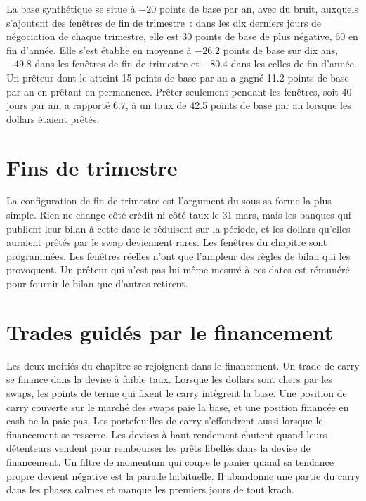 La base synthétique se situe à $-20$ points de base par an, avec du bruit, auxquels s'ajoutent des fenêtres de fin de trimestre~: dans les dix derniers jours de négociation de chaque trimestre, elle est
30 points de base de plus négative, 60 en fin d'année. Elle s'est établie en moyenne à $-26.2$ points de base sur dix ans, $-49.8$ dans les fenêtres de fin de trimestre et $-80.4$ dans les
celles de fin d'année. Un prêteur dont le  atteint 15 points de base par an a gagné 11.2
points de base par an en prêtant en permanence. Prêter seulement pendant les fenêtres, soit 40 jours par an, a rapporté 6.7, à un taux de 42.5 points de base par an lorsque les dollars étaient prêtés.

\section{Fins de trimestre}

La configuration de fin de trimestre est l'argument du  sous sa forme la plus simple. Rien ne change côté crédit ni côté taux le 31 mars, mais les banques qui publient
leur bilan à cette date le réduisent sur la période, et les dollars qu'elles auraient prêtés par le swap deviennent rares. Les fenêtres du chapitre sont
programmées. Les fenêtres réelles n'ont que l'ampleur des règles de bilan qui les provoquent. Un prêteur qui n'est pas lui-même mesuré à ces dates est rémunéré pour
fournir le bilan que d'autres retirent.

\section{Trades guidés par le financement}

Les deux moitiés du chapitre se rejoignent dans le financement. Un trade de carry se finance dans la devise à faible taux. Lorsque les dollars sont chers par les swaps, les points
de terme qui fixent le carry intègrent la base. Une position de carry couverte sur le marché des swaps paie la base, et une position financée en cash ne la paie pas. Les portefeuilles de carry
s'effondrent aussi lorsque le financement se resserre. Les devises à haut rendement chutent quand leurs détenteurs vendent pour rembourser les prêts libellés dans la devise de financement. Un filtre de momentum qui coupe le
panier quand sa tendance propre devient négative est la parade habituelle. Il abandonne une partie du carry dans les phases calmes et manque les premiers jours de tout krach.

